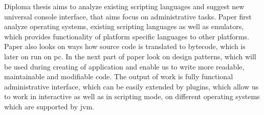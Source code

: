 Diploma thesis aims to analyze existing scripting languages and suggest new universal console interface, that aims focus on administrative tasks. Paper first analyze operating systems, existing scripting languages as well as emulators, which provides functionality of platform specific languages to other platforms. Paper also looks on ways how source code is translated to bytecode, which is later on run on \acrshort{pc}. In the next part of paper look on design patterns, which will be used during creating of application and  enable us to write more readable, maintainable and modifiable code. The output of work is fully functional administrative interface, which can be easily extended by plugins, which allow us to work in interactive as well as in scripting mode, on different operating systems which are supported by  \acrshort{jvm}. 


